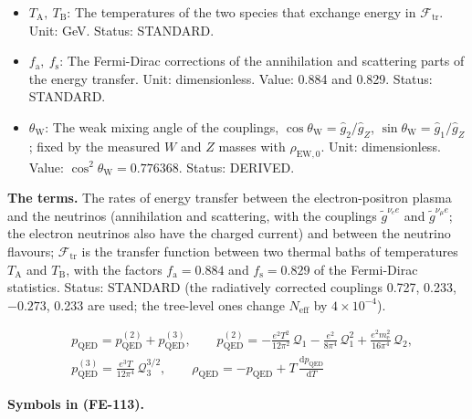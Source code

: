 \documentclass[
  10pt,
]{article}
\begin{document}
\begin{itemize}
  \(\tilde g^{\nu_\mu e}_R = \sin^2\theta_{\mathrm{W}}\). Unit:
  dimensionless. Value: \(-0.273\) and 0.233 (radiatively corrected).
  Status: STANDARD.
\item
  \(T_{\mathrm{A}},\ T_{\mathrm{B}}\): The temperatures of the two
  species that exchange energy in \(\mathcal{F}_{\mathrm{tr}}\). Unit:
  GeV. Status: STANDARD.
\item
  \(f_{\mathrm{a}},\ f_{\mathrm{s}}\): The Fermi-Dirac corrections of
  the annihilation and scattering parts of the energy transfer. Unit:
  dimensionless. Value: 0.884 and 0.829. Status: STANDARD.
\item
  \(\theta_{\mathrm{W}}\): The weak mixing angle of the couplings,
  \(\cos\theta_{\mathrm{W}} = \hat g_2/\hat g_Z\),
  \(\sin\theta_{\mathrm{W}} = \hat g_1/\hat g_Z\); fixed by the measured
  \(W\) and \(Z\) masses with \(\rho_{\mathrm{EW},0}\). Unit:
  dimensionless. Value: \(\cos^2\theta_{\mathrm{W}} = 0.776368\).
  Status: DERIVED.
\end{itemize}

\textbf{The terms.} The rates of energy transfer between the
electron-positron plasma and the neutrinos (annihilation and scattering,
with the couplings \(\tilde g^{\nu_e e}\) and \(\tilde g^{\nu_\mu e}\);
the electron neutrinos also have the charged current) and between the
neutrino flavours; \(\mathcal{F}_{\mathrm{tr}}\) is the transfer
function between two thermal baths of temperatures \(T_{\mathrm{A}}\)
and \(T_{\mathrm{B}}\), with the factors \(f_{\mathrm{a}} = 0.884\) and
\(f_{\mathrm{s}} = 0.829\) of the Fermi-Dirac statistics. Status:
STANDARD (the radiatively corrected couplings 0.727, 0.233, \(-0.273\),
0.233 are used; the tree-level ones change \(N_{\mathrm{eff}}\) by
\(4\times10^{-4}\)).

\[
\begin{aligned}
&p_{\mathrm{QED}} = p_{\mathrm{QED}}^{(2)} + p_{\mathrm{QED}}^{(3)},\qquad
 p_{\mathrm{QED}}^{(2)} = -\frac{e^2T^2}{12\pi^2}\,\mathcal{Q}_1 - \frac{e^2}{8\pi^4}\,\mathcal{Q}_1^2
 + \frac{e^2m_{\mathrm{e}}^2}{16\pi^4}\,\mathcal{Q}_2,\\
&p_{\mathrm{QED}}^{(3)} = \frac{e^3T}{12\pi^4}\,\mathcal{Q}_3^{3/2},\qquad
 \rho_{\mathrm{QED}} = -p_{\mathrm{QED}} + T\,\frac{\mathrm{d}p_{\mathrm{QED}}}{\mathrm{d}T}
\end{aligned} \tag{FE-113}
\]

\textbf{Symbols in (FE-113).}
\end{document}
